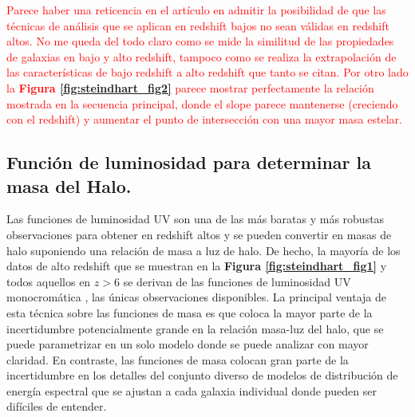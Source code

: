 \documentclass{article}
\begin{document}
\textcolor{red}{Parece haber una reticencia en el artículo en admitir la posibilidad de que las técnicas de análisis que se aplican en redshift bajos no sean válidas en redshift altos. No me queda del todo claro como se mide la similitud de las propiedades de galaxias en bajo y alto redshift, tampoco como se realiza la extrapolación de las características de bajo redshift a alto redshift que tanto se citan. Por otro lado la \textbf{Figura \ref{fig:steindhart_fig2}} parece mostrar perfectamente la relación mostrada en la secuencia principal, donde el slope parece mantenerse (creciendo con el redshift) y aumentar el punto de intersección con una mayor masa estelar.}

\subsection*{Función de luminosidad para determinar la masa del Halo.}
Las funciones de luminosidad UV son una de las más baratas y más robustas observaciones para obtener en redshift altos y se pueden convertir en masas de halo suponiendo una relación de masa a luz de halo. De hecho, la mayoría de los datos de alto redshift que se muestran en la \textbf{Figura \ref{fig:steindhart_fig1}} y todos aquellos en $z> 6$ se derivan de las funciones de luminosidad UV monocromática , las únicas observaciones disponibles. La principal ventaja de esta técnica sobre las funciones de masa es que coloca la mayor parte de la incertidumbre potencialmente grande en la relación masa-luz del halo, que se puede parametrizar en un solo modelo donde se puede analizar con mayor claridad. En contraste, las funciones de masa colocan gran parte de la incertidumbre en los detalles del conjunto diverso de modelos de distribución de energía espectral que se ajustan a cada galaxia individual donde pueden ser difíciles de entender.
\newpage



\newpage
\appendix

\end{document}
